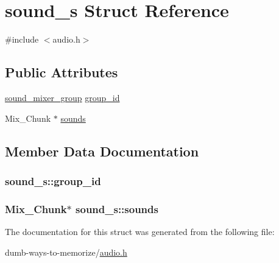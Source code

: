 \hypertarget{structsound__s}{}\section{sound\+\_\+s Struct Reference}
\label{structsound__s}


{\ttfamily \#include $<$audio.\+h$>$}

\subsection*{Public Attributes}
\begin{DoxyCompactItemize}
\item 
\hyperlink{audio_8h_aefd8a54164d8e94ab23d6e2325d31d62}{sound\+\_\+mixer\+\_\+group} \hyperlink{structsound__s_a6cf98984674624b06f409c6ee13b97a0}{group\+\_\+id}
\item 
Mix\+\_\+\+Chunk $\ast$ \hyperlink{structsound__s_aa063949170cc2c3f85256c4c1313b27d}{sounds}
\end{DoxyCompactItemize}


\subsection{Member Data Documentation}
\subsubsection[{\texorpdfstring{group\+\_\+id}{group_id}}]{ sound\+\_\+s\+::group\+\_\+id}\hypertarget{structsound__s_a6cf98984674624b06f409c6ee13b97a0}{}\label{structsound__s_a6cf98984674624b06f409c6ee13b97a0}
\subsubsection[{\texorpdfstring{sounds}{sounds}}]{\setlength{\rightskip}{0pt plus 5cm}Mix\+\_\+\+Chunk$\ast$ sound\+\_\+s\+::sounds}\hypertarget{structsound__s_aa063949170cc2c3f85256c4c1313b27d}{}\label{structsound__s_aa063949170cc2c3f85256c4c1313b27d}


The documentation for this struct was generated from the following file\+:\begin{DoxyCompactItemize}
\item 
dumb-\/ways-\/to-\/memorize/\hyperlink{audio_8h}{audio.\+h}\end{DoxyCompactItemize}
